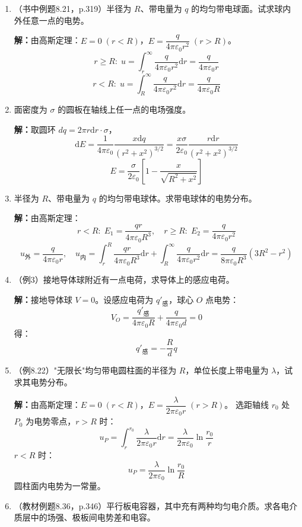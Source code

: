 \documentclass{ctexart}
\begin{document}
\begin{enumerate}
\item（书中例题8.21，p.319）半径为 $R$、带电量为 $q$ 的均匀带电球面。试求球内外任意一点的电势。

\textbf{解：}由高斯定理：$E = 0\;(r < R)$，$E = \dfrac{q}{4\pi\varepsilon_0 r^{2}}\;(r > R)$。
\[
r \ge R:\; u = \int_r^{\infty} \frac{q}{4\pi\varepsilon_0 r^{2}}\mathrm{d}r = \frac{q}{4\pi\varepsilon_0 r}
\]
\[
r < R:\; u = \int_R^{\infty} \frac{q}{4\pi\varepsilon_0 r^{2}}\mathrm{d}r = \frac{q}{4\pi\varepsilon_0 R}
\]

\item 面密度为 $\sigma$ 的圆板在轴线上任一点的电场强度。

\textbf{解：}取圆环 $dq = 2\pi r\mathrm{d}r\cdot\sigma$，
\[
\mathrm{d}E = \frac{1}{4\pi\varepsilon_0}\frac{x\mathrm{d}q}{(r^{2}+x^{2})^{3/2}}
= \frac{x\sigma}{2\varepsilon_0}\frac{r\mathrm{d}r}{(r^{2}+x^{2})^{3/2}}
\]
\[
E = \frac{\sigma}{2\varepsilon_0}\left[1 - \frac{x}{\sqrt{R^{2}+x^{2}}}\right]
\]

\item 半径为 $R$、带电量为 $q$ 的均匀带电球体。求带电球体的电势分布。

\textbf{解：}由高斯定理：
\[
r < R:\; E_1 = \frac{qr}{4\pi\varepsilon_0 R^{3}},\quad
r \ge R:\; E_2 = \frac{q}{4\pi\varepsilon_0 r^{2}}
\]
\[
u_{\text{外}} = \frac{q}{4\pi\varepsilon_0 r},\quad
u_{\text{内}} = \int_r^R \frac{qr}{4\pi\varepsilon_0 R^{3}}\mathrm{d}r + \int_R^{\infty} \frac{q}{4\pi\varepsilon_0 r^{2}}\mathrm{d}r
= \frac{q}{8\pi\varepsilon_0 R^{3}}(3R^{2} - r^{2})
\]

\item（例3）接地导体球附近有一点电荷，求导体上的感应电荷。

\textbf{解：}接地导体球 $V = 0$。设感应电荷为 $q'_{\text{感}}$，球心 $O$ 点电势：
\[
V_O = \frac{q'_{\text{感}}}{4\pi\varepsilon_0 R} + \frac{q}{4\pi\varepsilon_0 d} = 0
\]
得：
\[
q'_{\text{感}} = -\frac{R}{d}q
\]

\item（例8.22）"无限长"均匀带电圆柱面的半径为 $R$，单位长度上带电量为 $\lambda$，试求其电势分布。

\textbf{解：}由高斯定理：$E = 0\;(r < R)$，$E = \dfrac{\lambda}{2\pi\varepsilon_0 r}\;(r > R)$。
选距轴线 $r_0$ 处 $P_0$ 为电势零点，$r > R$ 时：
\[
u_P = \int_r^{r_0} \frac{\lambda}{2\pi\varepsilon_0 r}\mathrm{d}r = \frac{\lambda}{2\pi\varepsilon_0}\ln\frac{r_0}{r}
\]
$r < R$ 时：
\[
u_P = \frac{\lambda}{2\pi\varepsilon_0}\ln\frac{r_0}{R}
\]
圆柱面内电势为一常量。

\item（教材例题8.36，p.346）平行板电容器，其中充有两种均匀电介质。求各电介质层中的场强、极板间电势差和电容。


\end{enumerate}
\end{document}
